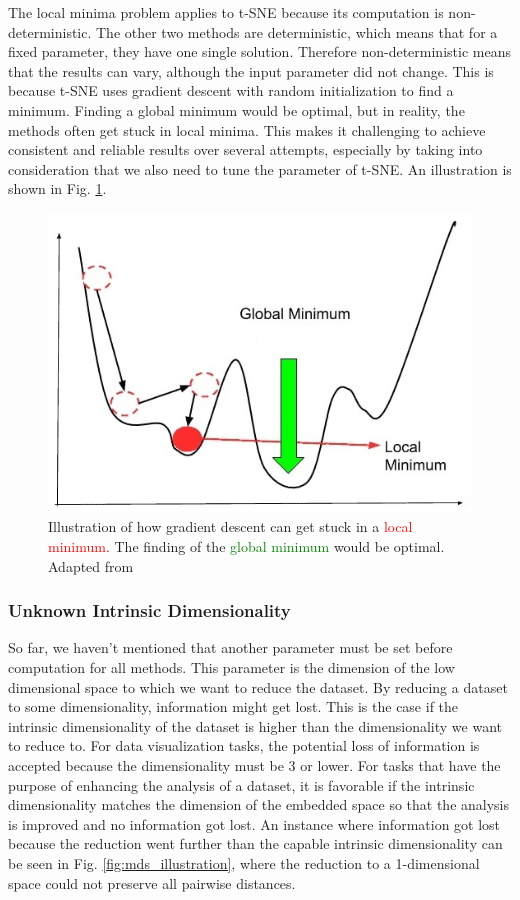 The local minima problem applies to t-SNE because its computation is non-deterministic. The other two methods are deterministic, which means that for a fixed parameter, they have one single solution. Therefore non-deterministic means that the results can vary, although the input parameter did not change. This is because t-SNE uses gradient descent with random initialization to find a minimum. Finding a global minimum would be optimal, but in reality, the methods often get stuck in local minima. This makes it challenging to achieve consistent and reliable results over several attempts, especially by taking into consideration that we also need to tune the parameter of t-SNE. An illustration is shown in Fig. \ref{fig:local_minima}. \cite{t-SNE08}
\begin{figure}[!]
	\centering
	\includegraphics[width=0.7\columnwidth]{images/local_minima.jpg}
	\caption[Stuck in Local Minima]{Illustration of how gradient descent can get stuck in a \textcolor{red}{local minimum}. The finding of the \textcolor{green}{global minimum} would be optimal. Adapted from \footnotemark}
    \label{fig:local_minima}
\end{figure}

\subsubsection{Unknown Intrinsic Dimensionality}

So far, we haven't mentioned that another parameter must be set before computation for all methods. This parameter is the dimension of the low dimensional space to which we want to reduce the dataset. By reducing a dataset to some dimensionality, information might get lost. This is the case if the intrinsic dimensionality of the dataset is higher than the dimensionality we want to reduce to. For data visualization tasks, the potential loss of information is accepted because the dimensionality must be 3 or lower. For tasks that have the purpose of enhancing the analysis of a dataset, it is favorable if the intrinsic dimensionality matches the dimension of the embedded space so that the analysis is improved and no information got lost. An instance where information got lost because the reduction went further than the capable intrinsic dimensionality can be seen in Fig. \ref{fig:mds_illustration}, where the reduction to a 1-dimensional space could not preserve all pairwise distances.

